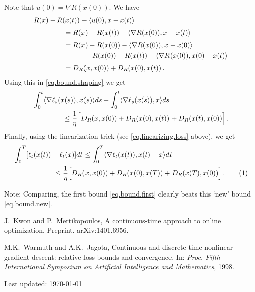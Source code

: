 \documentclass[12pt]{article}
\theoremstyle{plain}
\theoremstyle{definition}
\theoremstyle{remark}
\begin{document}
Note that $u(0) = \nabla R(x(0))$. We have
\begin{align*}
&R(x) - R(x(t)) - \langle {u(0), x - x(t)}\rangle \\[1mm]
&\hspace{1.5cm}
= R(x) - R(x(t)) - \langle {\nabla R(x(0)), x - x(t)}\rangle \\[1mm]
&\hspace{1.5cm}
= R(x) - R(x(0)) - \langle {\nabla R(x(0)), x - x(0)}\rangle \\
&\hspace{2.5cm}
   + R(x(0)) - R(x(t)) - \langle {\nabla R(x(0)), x(0) - x(t)}\rangle \\[1mm]
&\hspace{1.5cm}
= D_{R}(x,x(0)) + D_{R}(x(0),x(t))\,.
\end{align*}
Using this in \eqref{eq.bound.shaping} we get
\begin{align*}
&\int_{0}^{t} \langle {\nabla\ell_{s}(x(s)), x(s)}\rangle ds - \int_{0}^{t} \langle {\nabla\ell_{s}(x(s)), x}\rangle ds \\
&\hspace{1.5cm}
\leq \frac{1}{\eta} \Bigl[ D_{R}(x,x(0)) + D_{R}(x(0),x(t)) + D_{R}(x(t), x(0)) \Bigr]\,.
\end{align*}
Finally, using the linearization trick (see \eqref{eq.linearizing.loss} above), we get
\begin{align*}
&\int_{0}^{T} [\ell_{t}(x(t)) - \ell_{t}(x)] dt
\leq \int_{0}^{T} \ab{\nabla\ell_{t}(x(t)), x(t) - x} dt \\
&\hspace{2.0cm}
\leq \frac{1}{\eta} \Bigl[ D_{R}(x,x(0)) + D_{R}(x(0),x(T)) + D_{R}(x(T), x(0)) \Bigr]\,.
\addtocounter{equation}{1}
\label{eq.bound.new}  \tag{\theequation}
\end{align*}

\medskip

\noindent
Note: Comparing, the first bound \eqref{eq.bound.first} clearly beats this
`new' bound \eqref{eq.bound.new}.



\medskip

\begin{thebibliography}{biblio}

  J.~Kwon and P.~Mertikopoulos,
  A continuous-time approach to online optimization.
  Preprint. arXiv:1401.6956.

  M.K.~Warmuth and A.K.~Jagota,
  Continuous and discrete-time nonlinear gradient descent: relative loss bounds and convergence.
  In: 
  \textit{Proc. Fifth International Symposium on Artificial Intelligence and Mathematics}, 1998.


\end{thebibliography}


\vspace{.5cm}


\noindent
Last updated: \today
\end{document}

